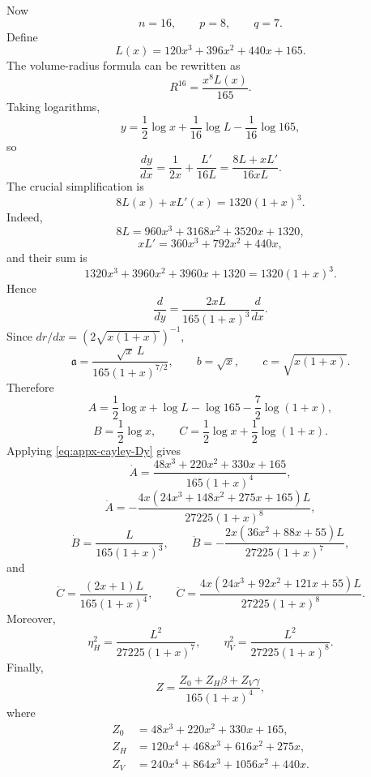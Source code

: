 \documentclass[11pt,reqno]{amsart}
\numberwithin{equation}{section}
\theoremstyle{definition}
\theoremstyle{remark}
\begin{document}
Now
\[
n=16,\qquad p=8,\qquad q=7.
\]
Define
\[
L(x)=120x^3+396x^2+440x+165.
\]
The volume-radius formula can be rewritten as
\begin{equation}
R^{16}=\frac{x^8L(x)}{165}.
\label{eq:appx-cayley-R}
\end{equation}
Taking logarithms,
\[
y=\frac{1}{2}\log x+\frac{1}{16}\log L-\frac{1}{16}\log165,
\]
so
\begin{equation}
\frac{dy}{dx}=\frac{1}{2x}+\frac{L'}{16L}
=\frac{8L+xL'}{16xL}.
\label{eq:appx-cayley-dydx-pre}
\end{equation}
The crucial simplification is
\begin{equation}
8L(x)+xL'(x)=1320(1+x)^3.
\label{eq:appx-cayley-key}
\end{equation}
Indeed,
\[
8L=960x^3+3168x^2+3520x+1320,
\]
\[
xL'=360x^3+792x^2+440x,
\]
and their sum is
\[
1320x^3+3960x^2+3960x+1320=1320(1+x)^3.
\]
Hence
\begin{equation}
\frac{d}{dy}
=\frac{2xL}{165(1+x)^3}\frac{d}{dx}.
\label{eq:appx-cayley-Dy}
\end{equation}
Since $dr/dx=(2\sqrt{x(1+x)})^{-1}$,
\begin{equation}
\mathfrak a=\frac{\sqrt x\,L}{165(1+x)^{7/2}},
\qquad
b=\sqrt x,
\qquad
c=\sqrt{x(1+x)}.
\label{eq:appx-cayley-abc}
\end{equation}
Therefore
\[
A=\frac{1}{2}\log x+\log L-\log165-\frac{7}{2}\log(1+x),
\]
\[
B=\frac{1}{2}\log x,
\qquad
C=\frac{1}{2}\log x+\frac{1}{2}\log(1+x).
\]
Applying \eqref{eq:appx-cayley-Dy} gives
\begin{equation}
\dot A=\frac{48x^3+220x^2+330x+165}{165(1+x)^4},
\label{eq:appx-cayley-Adot}
\end{equation}
\begin{equation}
\ddot A
=-\frac{4x(24x^3+148x^2+275x+165)L}{27225(1+x)^8},
\label{eq:appx-cayley-Addot}
\end{equation}
\begin{equation}
\dot B=\frac{L}{165(1+x)^3},
\qquad
\ddot B=-\frac{2x(36x^2+88x+55)L}{27225(1+x)^7},
\label{eq:appx-cayley-Bdots}
\end{equation}
and
\begin{equation}
\dot C=\frac{(2x+1)L}{165(1+x)^4},
\qquad
\ddot C=\frac{4x(24x^3+92x^2+121x+55)L}{27225(1+x)^8}.
\label{eq:appx-cayley-Cdots}
\end{equation}
Moreover,
\begin{equation}
\eta_H^2=\frac{L^2}{27225(1+x)^7},
\qquad
\eta_V^2=\frac{L^2}{27225(1+x)^8}.
\label{eq:appx-cayley-eta}
\end{equation}
Finally,
\begin{equation}
Z=\frac{Z_0+Z_H\beta+Z_V\gamma}{165(1+x)^4},
\label{eq:appx-cayley-Z}
\end{equation}
where
\begin{align*}
Z_0&=48x^3+220x^2+330x+165,\\
Z_H&=120x^4+468x^3+616x^2+275x,\\
Z_V&=240x^4+864x^3+1056x^2+440x.
\end{align*}
\end{document}
